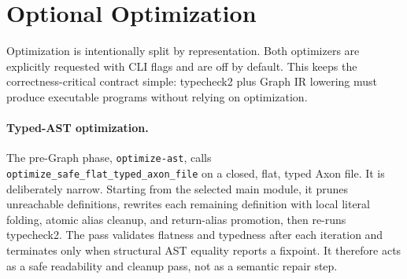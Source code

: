 \documentclass{article}
\newcommand{\code}[1]{\texttt{#1}}
\begin{document}
\section{Optional Optimization}

Optimization is intentionally split by representation.  Both optimizers are
explicitly requested with CLI flags and are off by default.  This keeps the
correctness-critical contract simple: typecheck2 plus Graph IR lowering must
produce executable programs without relying on optimization.

\paragraph{Typed-AST optimization.}
The pre-Graph phase, \code{optimize-ast}, calls
\code{optimize\_safe\_flat\_typed\_axon\_file} on a closed, flat, typed Axon
file.  It is deliberately narrow.  Starting from the selected main module, it
prunes unreachable definitions, rewrites each remaining definition with local
literal folding, atomic alias cleanup, and return-alias promotion, then re-runs
typecheck2.  The pass validates flatness and typedness after each iteration and
terminates only when structural AST equality reports a fixpoint.  It therefore
acts as a safe readability and cleanup pass, not as a semantic repair step.
\end{document}

